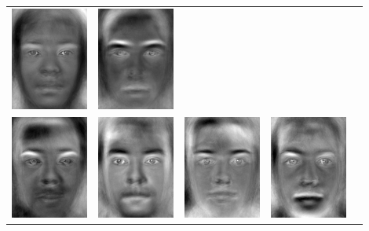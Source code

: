 \documentclass[12pt]{article}
\begin{document}
\begin{enumerate}
\begin{enumerate}
\begin{table}[H]
\begin{tabular}{ccccc}
\includegraphics[width=1in]{pca/8}&\includegraphics[width=1in]{pca/9}\\
\includegraphics[width=1in]{pca/10}&\includegraphics[width=1in]{pca/11}&
\includegraphics[width=1in]{pca/12}&\includegraphics[width=1in]{pca/13}&

\end{tabular}
\end{table}
\end{enumerate}
\end{enumerate}
\end{document}
